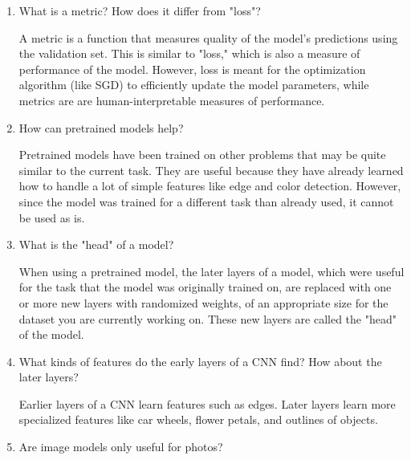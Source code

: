 \documentclass[12pt,a4paper]{article}
\begin{document}
\begin{enumerate}
\bigbreak

\item What is a metric? How does it differ from "loss"? \\

\smallbreak

A metric is a function that measures quality of the model's predictions using the validation set. This is similar to "loss," which is also a measure of performance of the model. However, loss is meant for the optimization algorithm (like SGD) to efficiently update the model parameters, while metrics are are human-interpretable measures of performance. 

\bigbreak

\item How can pretrained models help? \\

\smallbreak

Pretrained models have been trained on other problems that may be quite similar to the current task. They are useful because they have already learned how to handle a lot of simple features like edge and color detection. However, since the model was trained for a different task than already used, it cannot be used as is.

\bigbreak

\item What is the "head" of a model? \\

\smallbreak

When using a pretrained model, the later layers of a model, which were useful for the task that the model was originally trained on, are replaced with one or more new layers with randomized weights, of an appropriate size for the dataset you are currently working on. These new layers are called the "head" of the model.

\bigbreak

\item What kinds of features do the early layers of a CNN find? How about the later layers? \\

\smallbreak

Earlier layers of a CNN learn features such as edges. Later layers learn more specialized features like car wheels, flower petals, and outlines of objects.

\bigbreak

\item Are image models only useful for photos? \\


\end{enumerate}
\end{document}
